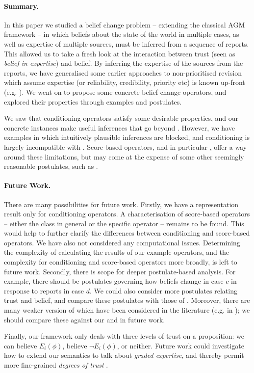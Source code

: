 \paragraph{Summary.} In this paper we studied a belief change problem --
extending the classical AGM framework -- in which
beliefs about the state of the world in multiple cases, as well as expertise of
multiple sources, must be inferred from a sequence of reports. This allowed us
to take a fresh look at the
interaction between trust (seen as \emph{belief in expertise}) and belief.
By inferring the expertise of the sources from the reports,
we have generalised some earlier approaches to non-prioritised
revision which assume expertise (or reliability, credibility, priority
etc) is known up-front (e.g.
\cite{ferme1999selective,hansson_2001,booth_trust_2018,delgrande2006iterated}).
We went on to propose some concrete belief change operators, and explored their
properties through examples and postulates.

We saw that conditioning operators satisfy some desirable
properties, and our concrete instances make useful inferences that go
beyond \weakop{}. However, we have examples in which intuitively plausible
inferences are blocked, and conditioning is largely incompatible with
\strongcondsucc{}. Score-based operators, and in particular \scorebasedop{},
offer a way around these limitations, but may
come at the expense of some other seemingly reasonable postulates, such as
\duprem{}.

\paragraph{Future Work.} There are many possibilities for future work.
%
Firstly, we have a representation result only for conditioning operators. A
characterisation of score-based operators -- either the class in general or the
specific operator \scorebasedop{} -- remains to be found. This would help to
further clarify the differences between conditioning and score-based operators.
%
We have also not considered any computational issues. Determining the
complexity of calculating the results of our example operators, and the
complexity for conditioning and score-based operators more broadly, is left to
future work.
%
Secondly, there is scope for deeper postulate-based analysis. For example,
there should be postulates governing how beliefs change in case $c$ in response
to reports in case $d$. We could also consider more postulates relating trust
and belief, and compare these postulates with those of \textcite{yasser_21}.
Moreover, there are many weaker version of  which have
been considered in the literature (e.g. in
\cite{ferme1999selective,hansson_2001,booth_trust_2018}); we should compare
these against our \condsucc{} and \strongcondsucc{} in future work.

Finally, our framework only deals with three levels of trust on a proposition:
we can believe $E_i(\phi)$, believe $\neg E_i(\phi)$, or neither.
Future work could investigate how to extend our semantics to talk about \emph{graded
expertise}, and thereby permit more fine-grained \emph{degrees of trust}
\cite{hunter_building_21,yasser_21,delgrande2006iterated}.
